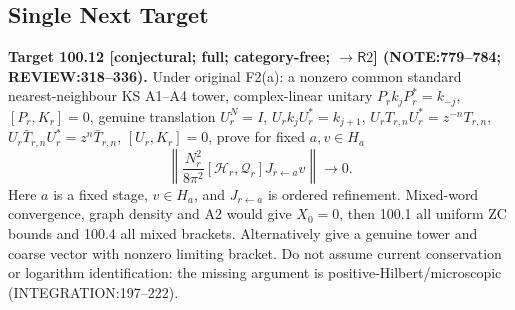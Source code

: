 \subsection{Single Next Target}

\textbf{Target 100.12 [conjectural; full; category-free; \(\to\mathsf R2\)] (NOTE:779--784; REVIEW:318--336).}
Under original F2(a): a nonzero common standard nearest-neighbour KS A1--A4 tower, complex-linear unitary
\(P_rk_jP_r^*=k_{-j}\), \([P_r,K_r]=0\), genuine translation \(U_r^N=I\), \(U_rk_jU_r^*=k_{j+1}\),
\(U_rT_{r,n}U_r^*=z^{-n}T_{r,n}\), \(U_r\bar T_{r,n}U_r^*=z^n\bar T_{r,n}\), \([U_r,K_r]=0\), prove for fixed \(a,v\in H_a\)
\[
 \left\|\frac{N_r^2}{8\pi^2}[\mathcal H_r,\mathcal Q_r]J_{r\leftarrow a}v\right\|\longrightarrow0.
\]
Here \(a\) is a fixed stage, \(v\in H_a\), and \(J_{r\leftarrow a}\) is ordered refinement. Mixed-word convergence,
graph density and A2 would give \(X_0=0\), then 100.1 all uniform ZC bounds and 100.4 all mixed brackets.
Alternatively give a genuine tower and coarse vector with nonzero limiting bracket. Do not assume current conservation or logarithm identification: the missing argument is positive-Hilbert/microscopic (INTEGRATION:197--222).
